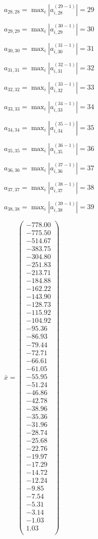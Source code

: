 \documentclass[a4paper,12pt]{article}
\begin{document}
$a _{ 28, 28 } =  \max _i |a _{ i, 28 } ^{ (29 - 1) } | = 29$

$a _{ 29, 29 } =  \max _i |a _{ i, 29 } ^{ (30 - 1) } | = 30$

$a _{ 30, 30 } =  \max _i |a _{ i, 30 } ^{ (31 - 1) } | = 31$

$a _{ 31, 31 } =  \max _i |a _{ i, 31 } ^{ (32 - 1) } | = 32$

$a _{ 32, 32 } =  \max _i |a _{ i, 32 } ^{ (33 - 1) } | = 33$

$a _{ 33, 33 } =  \max _i |a _{ i, 33 } ^{ (34 - 1) } | = 34$

$a _{ 34, 34 } =  \max _i |a _{ i, 34 } ^{ (35 - 1) } | = 35$

$a _{ 35, 35 } =  \max _i |a _{ i, 35 } ^{ (36 - 1) } | = 36$

$a _{ 36, 36 } =  \max _i |a _{ i, 36 } ^{ (37 - 1) } | = 37$

$a _{ 37, 37 } =  \max _i |a _{ i, 37 } ^{ (38 - 1) } | = 38$

$a _{ 38, 38 } =  \max _i |a _{ i, 38 } ^{ (39 - 1) } | = 39$

$\bar { x } = \begin{pmatrix}
-778.00 \\
-775.50 \\
-514.67 \\
-383.75 \\
-304.80 \\
-251.83 \\
-213.71 \\
-184.88 \\
-162.22 \\
-143.90 \\
-128.73 \\
-115.92 \\
-104.92 \\
-95.36 \\
-86.93 \\
-79.44 \\
-72.71 \\
-66.61 \\
-61.05 \\
-55.95 \\
-51.24 \\
-46.86 \\
-42.78 \\
-38.96 \\
-35.36 \\
-31.96 \\
-28.74 \\
-25.68 \\
-22.76 \\
-19.97 \\
-17.29 \\
-14.72 \\
-12.24 \\
-9.85 \\
-7.54 \\
-5.31 \\
-3.14 \\
-1.03 \\
1.03 \\
\end{pmatrix}
$
\end{document}
